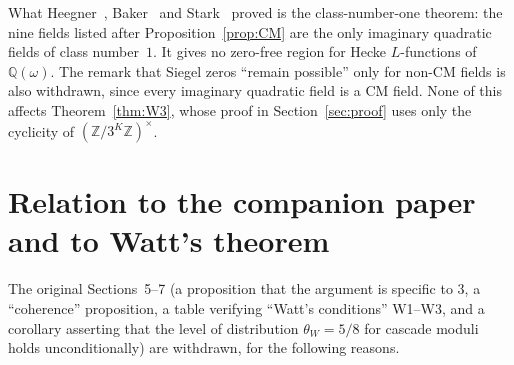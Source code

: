 \documentclass[12pt]{amsart}
\theoremstyle{plain}
\theoremstyle{definition}
\theoremstyle{remark}
\newcommand{\Z}{\mathbb{Z}}
\newcommand{\Q}{\mathbb{Q}}
\newcommand{\Qomega}{\Q(\omega)}
\begin{document}
What Heegner~\cite{Heegner1952}, Baker~\cite{Baker1966} and
Stark~\cite{Stark1967} proved is the class-number-one theorem: the nine
fields listed after Proposition~\ref{prop:CM} are the only imaginary
quadratic fields of class number~$1$. It gives no zero-free region for
Hecke $L$-functions of $\Qomega$. The remark that Siegel zeros ``remain
possible'' only for non-CM fields is also withdrawn, since every imaginary
quadratic field is a CM field. None of this affects Theorem~\ref{thm:W3},
whose proof in Section~\ref{sec:proof} uses only the cyclicity of
$(\Z/3^K\Z)^\times$.

\section{Relation to the companion paper and to Watt's theorem}
\label{sec:relation}

The original Sections~5--7 (a proposition that the argument is specific to
$3$, a ``coherence'' proposition, a table verifying ``Watt's conditions''
W1--W3, and a corollary asserting that the level of distribution
$\theta_W = 5/8$ for cascade moduli holds unconditionally) are withdrawn,
for the following reasons.
\end{document}
